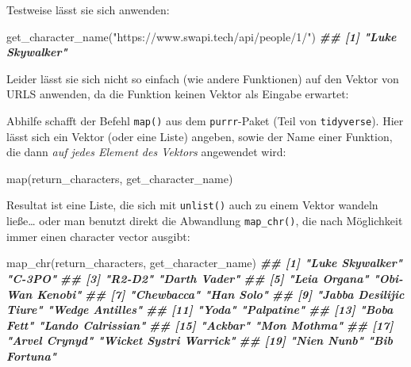 \documentclass[
  ngerman,
]{article}
\newenvironment{Shaded}{\begin{snugshade}}{\end{snugshade}}
\newcommand{\DocumentationTok}[1]{\textcolor[rgb]{0.56,0.35,0.01}{\textbf{\textit{#1}}}}
\newcommand{\FunctionTok}[1]{\textcolor[rgb]{0.00,0.00,0.00}{#1}}
\newcommand{\NormalTok}[1]{#1}
\newcommand{\StringTok}[1]{\textcolor[rgb]{0.31,0.60,0.02}{#1}}
\begin{document}
Testweise lässt sie sich anwenden:

\begin{Shaded}
\begin{Highlighting}[]
\FunctionTok{get\_character\_name}\NormalTok{(}\StringTok{"https://www.swapi.tech/api/people/1/"}\NormalTok{)}
\DocumentationTok{\#\# [1] "Luke Skywalker"}
\end{Highlighting}
\end{Shaded}

Leider lässt sie sich nicht so einfach (wie andere Funktionen) auf den Vektor von URLS anwenden, da die Funktion keinen Vektor als Eingabe erwartet:

Abhilfe schafft der Befehl \texttt{map()} aus dem \texttt{purrr}-Paket (Teil von \texttt{tidyverse}). Hier lässt sich ein Vektor (oder eine Liste) angeben, sowie der Name einer Funktion, die dann \emph{auf jedes Element des Vektors} angewendet wird:

\begin{Shaded}
\begin{Highlighting}[]
\FunctionTok{map}\NormalTok{(return\_characters, get\_character\_name)}
\end{Highlighting}
\end{Shaded}

Resultat ist eine Liste, die sich mit \texttt{unlist()} auch zu einem Vektor wandeln ließe\ldots{} oder man benutzt direkt die Abwandlung \texttt{map\_chr()}, die nach Möglichkeit immer einen character vector ausgibt:

\begin{Shaded}
\begin{Highlighting}[]
\FunctionTok{map\_chr}\NormalTok{(return\_characters, get\_character\_name)}
\DocumentationTok{\#\#  [1] "Luke Skywalker"        "C{-}3PO"                }
\DocumentationTok{\#\#  [3] "R2{-}D2"                 "Darth Vader"          }
\DocumentationTok{\#\#  [5] "Leia Organa"           "Obi{-}Wan Kenobi"       }
\DocumentationTok{\#\#  [7] "Chewbacca"             "Han Solo"             }
\DocumentationTok{\#\#  [9] "Jabba Desilijic Tiure" "Wedge Antilles"       }
\DocumentationTok{\#\# [11] "Yoda"                  "Palpatine"            }
\DocumentationTok{\#\# [13] "Boba Fett"             "Lando Calrissian"     }
\DocumentationTok{\#\# [15] "Ackbar"                "Mon Mothma"           }
\DocumentationTok{\#\# [17] "Arvel Crynyd"          "Wicket Systri Warrick"}
\DocumentationTok{\#\# [19] "Nien Nunb"             "Bib Fortuna"}
\end{Highlighting}
\end{Shaded}
\end{document}
